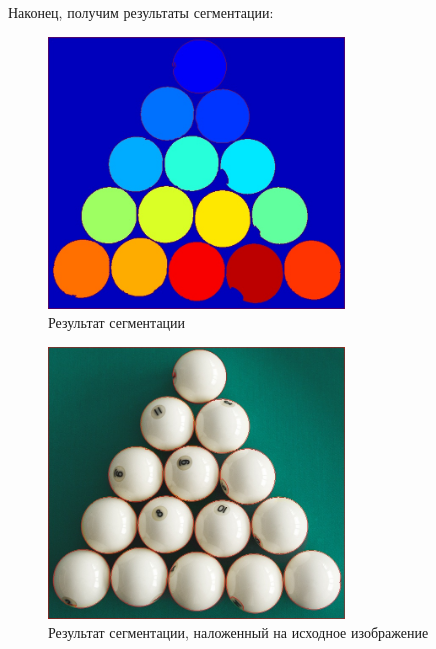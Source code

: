 Наконец, получим результаты сегментации:

\begin{figure}[ht!]
    \centering
    \includegraphics[width=0.7\textwidth]{images/transformed_images/3/Jet.jpg}
    \caption{Результат сегментации}
    \label{img:seg}
\end{figure} 
\clearpage
\begin{figure}[ht!]
    \centering
    \includegraphics[width=0.7\textwidth]{images/transformed_images/3/result.jpg}
    \caption{Результат сегментации, наложенный на исходное изображение}
    \label{img:seg_orig}
\end{figure} 